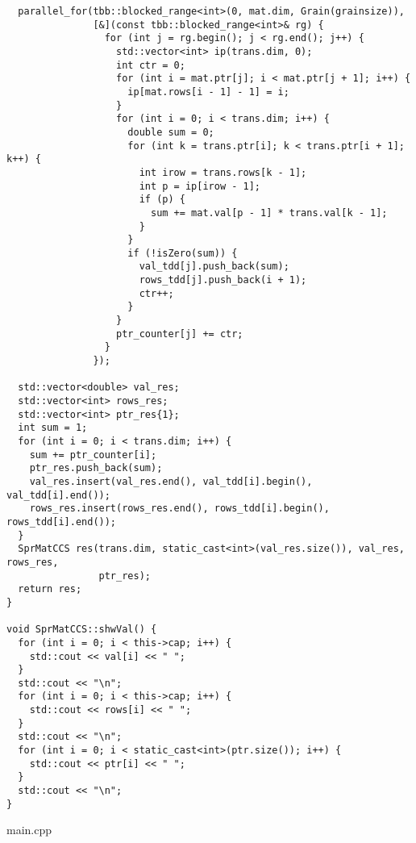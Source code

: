 \documentclass{report}
\begin{document}
\begin{lstlisting}
  parallel_for(tbb::blocked_range<int>(0, mat.dim, Grain(grainsize)),
               [&](const tbb::blocked_range<int>& rg) {
                 for (int j = rg.begin(); j < rg.end(); j++) {
                   std::vector<int> ip(trans.dim, 0);
                   int ctr = 0;
                   for (int i = mat.ptr[j]; i < mat.ptr[j + 1]; i++) {
                     ip[mat.rows[i - 1] - 1] = i;
                   }
                   for (int i = 0; i < trans.dim; i++) {
                     double sum = 0;
                     for (int k = trans.ptr[i]; k < trans.ptr[i + 1]; k++) {
                       int irow = trans.rows[k - 1];
                       int p = ip[irow - 1];
                       if (p) {
                         sum += mat.val[p - 1] * trans.val[k - 1];
                       }
                     }
                     if (!isZero(sum)) {
                       val_tdd[j].push_back(sum);
                       rows_tdd[j].push_back(i + 1);
                       ctr++;
                     }
                   }
                   ptr_counter[j] += ctr;
                 }
               });

  std::vector<double> val_res;
  std::vector<int> rows_res;
  std::vector<int> ptr_res{1};
  int sum = 1;
  for (int i = 0; i < trans.dim; i++) {
    sum += ptr_counter[i];
    ptr_res.push_back(sum);
    val_res.insert(val_res.end(), val_tdd[i].begin(), val_tdd[i].end());
    rows_res.insert(rows_res.end(), rows_tdd[i].begin(), rows_tdd[i].end());
  }
  SprMatCCS res(trans.dim, static_cast<int>(val_res.size()), val_res, rows_res,
                ptr_res);
  return res;
}

void SprMatCCS::shwVal() {
  for (int i = 0; i < this->cap; i++) {
    std::cout << val[i] << " ";
  }
  std::cout << "\n";
  for (int i = 0; i < this->cap; i++) {
    std::cout << rows[i] << " ";
  }
  std::cout << "\n";
  for (int i = 0; i < static_cast<int>(ptr.size()); i++) {
    std::cout << ptr[i] << " ";
  }
  std::cout << "\n";
}

\end{lstlisting}

\newpage
main.cpp
\end{document}
